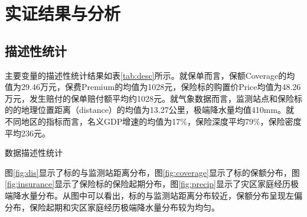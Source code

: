 \chapter{实证结果与分析}\label{chap:4}
\section{描述性统计}
主要变量的描述性统计结果如表\ref{tab:desc}所示。就保单而言，保额Coverage的均值为29.46万元，保费Premium的均值为1028元，保险标的购置价Price均值为48.26万元，发生赔付的保单赔付额平均约1028元。就气象数据而言，监测站点和保险标的的地理位置距离（distance）的均值为13.27公里，极端降水量均值410mm。就不同地区的指标而言，名义GDP增速的均值为17\%，保险深度平均79\%，保险密度平均236元。

\begin{table}[H]
    \caption{数据描述性统计}\label{tab:desc}
    \centering
    
\end{table}

图\ref{fig:dis}显示了标的与监测站距离分布，图\ref{fig:coverage}显示了标的保额分布，图\ref{fig:insurance}显示了保险标的保险起期分布，图\ref{fig:precip}显示了灾区家庭经历极端降水量分布。从图中可以看出，标的与监测站距离分布较近，保额分布呈现左偏分布，保险起期和灾区家庭经历极端降水量分布较为均匀。

